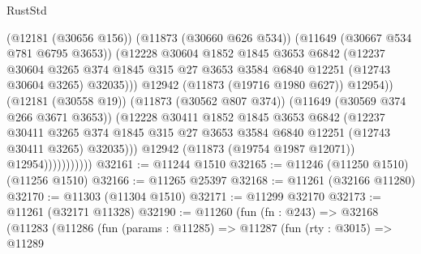 \begin{lexlean}{RustStd}
\begin{coremodule}
                                  (@12181 (@30656 @156))
                                  (@11873 (@30660 @626 @534))
                                  (@11649 (@30667 @534 @781 @6795 @3653))
                                  (@12228
                                    @30604
                                    @1852
                                    @1845
                                    @3653
                                    @6842
                                    (@12237
                                      @30604
                                      @3265
                                      @374
                                      @1845
                                      @315
                                      @27
                                      @3653
                                      @3584
                                      @6840
                                      @12251
                                      (@12743 @30604 @3265)
                                      @32035)))
                                @12942
                                (@11873 (@19716 @1980 @627))
                                @12954))
                            (@12181 (@30558 @19))
                            (@11873 (@30562 @807 @374))
                            (@11649 (@30569 @374 @266 @3671 @3653))
                            (@12228
                              @30411
                              @1852
                              @1845
                              @3653
                              @6842
                              (@12237
                                @30411
                                @3265
                                @374
                                @1845
                                @315
                                @27
                                @3653
                                @3584
                                @6840
                                @12251
                                (@12743 @30411 @3265)
                                @32035)))
                          @12942
                          (@11873 (@19754 @1987 @12071))
                          @12954)))))))))))
@32161 := @11244 @1510
@32165 := @11246 (@11250 @1510) (@11256 @1510)
@32166 := @11265 @25397
@32168 := @11261 (@32166 @11280)
@32170 := @11303 (@11304 @1510)
@32171 := @11299 @32170
@32173 := @11261 (@32171 @11328)
@32190 := @11260
    (fun (fn : @243) =>
    @32168
      (@11283
        (@11286
          (fun (params : @11285) =>
          @11287
            (fun (rty : @3015) =>
            @11289

\end{coremodule}
\end{lexlean}
